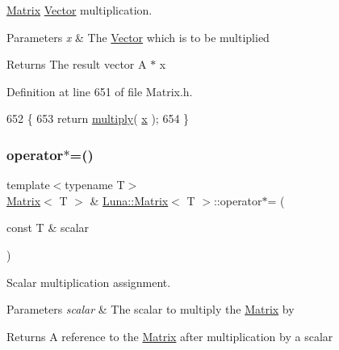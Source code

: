 \hyperlink{classLuna_1_1Matrix}{Matrix} \hyperlink{classLuna_1_1Vector}{Vector} multiplication. 


\begin{DoxyParams}{Parameters}
{\em x} & The \hyperlink{classLuna_1_1Vector}{Vector} which is to be multiplied \\
\hline
\end{DoxyParams}
\begin{DoxyReturn}{Returns}
The result vector A $\ast$ x 
\end{DoxyReturn}


Definition at line 651 of file Matrix.\+h.


\begin{DoxyCode}
652   \{
653     \textcolor{keywordflow}{return} \hyperlink{classLuna_1_1Matrix_a0a55d0f67f6fdfc33f13e0d89225617d}{multiply}( \hyperlink{namespaceHeat__plot_aa88370c16b85b784ccbde3ed88bc1991}{x} );
654   \}
\end{DoxyCode}
\mbox{\label{classLuna_1_1Matrix_af097bbfb48c4d9675faf66bb73f273b3}} 
\subsubsection{\texorpdfstring{operator$\ast$=()}{operator*=()}}
{\footnotesize\ttfamily template$<$typename T$>$ \\
\hyperlink{classLuna_1_1Matrix}{Matrix}$<$ T $>$ \& \hyperlink{classLuna_1_1Matrix}{Luna\+::\+Matrix}$<$ T $>$\+::operator$\ast$= (\begin{DoxyParamCaption}\item[{const T \&}]{scalar }\end{DoxyParamCaption})\hspace{0.3cm}{\ttfamily [inline]}}



Scalar multiplication assignment. 


\begin{DoxyParams}{Parameters}
{\em scalar} & The scalar to multiply the \hyperlink{classLuna_1_1Matrix}{Matrix} by \\
\hline
\end{DoxyParams}
\begin{DoxyReturn}{Returns}
A reference to the \hyperlink{classLuna_1_1Matrix}{Matrix} after multiplication by a scalar 
\end{DoxyReturn}


